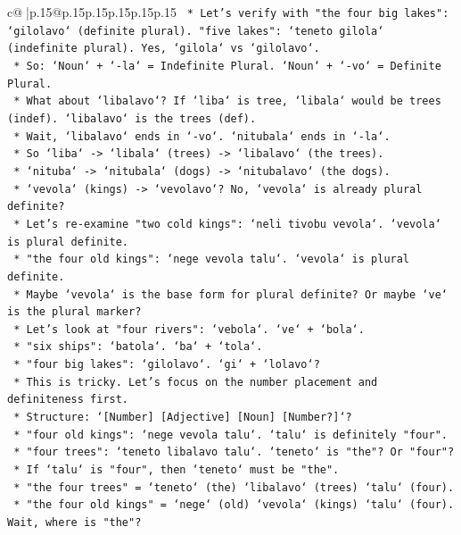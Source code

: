 \documentclass{article}
\begin{document}
{\begin{supertabular}{c@{$\;$}|p{.15\linewidth}@{}p{.15\linewidth}p{.15\linewidth}p{.15\linewidth}p{.15\linewidth}p{.15\linewidth}}
{{{\texttt{    *   Let's verify with "the four big lakes": `gilolavo` (definite plural). "five lakes": `teneto gilola` (indefinite plural). Yes, `gilola` vs `gilolavo`.} \\
\texttt{    *   So: `Noun` + `{-}la` = Indefinite Plural. `Noun` + `{-}vo` = Definite Plural.} \\
\texttt{    *   What about `libalavo`? If `liba` is tree, `libala` would be trees (indef). `libalavo` is the trees (def).} \\
\texttt{    *   Wait, `libalavo` ends in `{-}vo`. `nitubala` ends in `{-}la`.} \\
\texttt{    *   So `liba` {-}> `libala` (trees) {-}> `libalavo` (the trees).} \\
\texttt{    *   `nituba` {-}> `nitubala` (dogs) {-}> `nitubalavo` (the dogs).} \\
\texttt{    *   `vevola` (kings) {-}> `vevolavo`? No, `vevola` is already plural definite?} \\
\texttt{    *   Let's re{-}examine "two cold kings": `neli tivobu vevola`. `vevola` is plural definite.} \\
\texttt{    *   "the four old kings": `nege vevola talu`. `vevola` is plural definite.} \\
\texttt{    *   Maybe `vevola` is the base form for plural definite? Or maybe `ve` is the plural marker?} \\
\texttt{    *   Let's look at "four rivers": `vebola`. `ve` + `bola`.} \\
\texttt{    *   "six ships": `batola`. `ba` + `tola`.} \\
\texttt{    *   "four big lakes": `gilolavo`. `gi` + `lolavo`?} \\
\texttt{    *   This is tricky. Let's focus on the number placement and definiteness first.} \\
\texttt{    *   Structure: `{[}Number{]} {[}Adjective{]} {[}Noun{]} {[}Number?{]}`?} \\
\texttt{    *   "four old kings": `nege vevola talu`. `talu` is definitely "four".} \\
\texttt{    *   "four trees": `teneto libalavo talu`. `teneto` is "the"? Or "four"?} \\
\texttt{    *   If `talu` is "four", then `teneto` must be "the".} \\
\texttt{    *   "the four trees" = `teneto` (the) `libalavo` (trees) `talu` (four).} \\
\texttt{    *   "the four old kings" = `nege` (old) `vevola` (kings) `talu` (four). Wait, where is "the"?} \\
}}}
\end{supertabular}}
\end{document}
